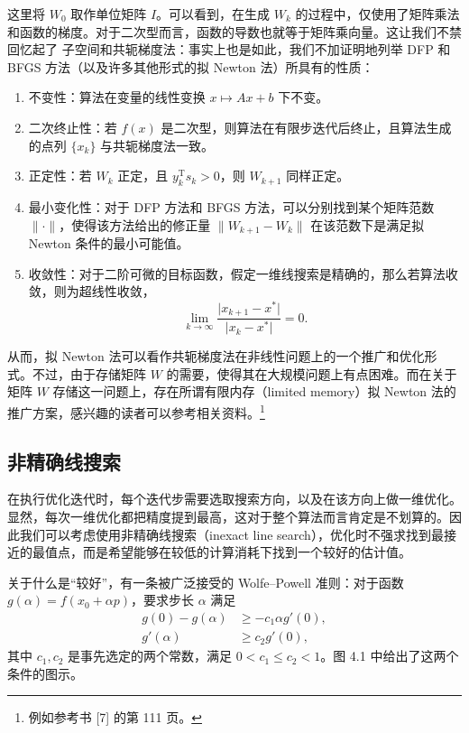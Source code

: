 这里将 $W_0$ 取作单位矩阵 $I$。可以看到，在生成 $W_k$ 的过程中，仅使用了矩阵乘法和函数的梯度。对于二次型而言，函数的导数也就等于矩阵乘向量。这让我们不禁回忆起了  子空间和共轭梯度法：事实上也是如此，我们不加证明地列举 DFP 和 BFGS 方法（以及许多其他形式的拟 Newton 法）所具有的性质：
\begin{enumerate}[label=(\arabic*)]
\item 不变性：算法在变量的线性变换 $x\mapsto Ax+b$ 下不变。
\item 二次终止性：若 $f(x)$ 是二次型，则算法在有限步迭代后终止，且算法生成的点列 $\{x_k\}$ 与共轭梯度法一致。
\item 正定性：若 $W_k$ 正定，且 $y_k^{\mathrm T}s_k>0$，则 $W_{k+1}$ 同样正定。
\item 最小变化性：对于 DFP 方法和 BFGS 方法，可以分别找到某个矩阵范数 $\|\cdot\|$，使得该方法给出的修正量 $\|W_{k+1}-W_k\|$ 在该范数下是满足拟 Newton 条件的最小可能值。
\item 收敛性：对于二阶可微的目标函数，假定一维线搜索是精确的，那么若算法收敛，则为超线性收敛，
\[
\lim_{k\to\infty}\frac{\lvert x_{k+1}-x^*\rvert}{\lvert x_k-x^*\rvert}=0.
\]
\end{enumerate}
从而，拟 Newton 法可以看作共轭梯度法在非线性问题上的一个推广和优化形式。不过，由于存储矩阵 $W$ 的需要，使得其在大规模问题上有点困难。而在关于矩阵 $W$ 存储这一问题上，存在所谓有限内存（limited memory）拟 Newton 法的推广方案，感兴趣的读者可以参考相关资料。\footnote{例如参考书 [7] 的第 111 页。}

\subsection{非精确线搜索}

在执行优化迭代时，每个迭代步需要选取搜索方向，以及在该方向上做一维优化。显然，每次一维优化都把精度提到最高，这对于整个算法而言肯定是不划算的。因此我们可以考虑使用非精确线搜索（inexact line search），优化时不强求找到最接近的最值点，而是希望能够在较低的计算消耗下找到一个较好的估计值。

关于什么是“较好”，有一条被广泛接受的 Wolfe--Powell 准则：对于函数 $g(\alpha)=f(x_0+\alpha p)$，要求步长 $\alpha$ 满足
\begin{align}
g(0)-g(\alpha)&\ge -c_1\alpha g'(0), \tag{4.1.23}\\
g'(\alpha)&\ge c_2 g'(0), \tag{4.1.24}
\end{align}
其中 $c_1,c_2$ 是事先选定的两个常数，满足 $0<c_1\le c_2<1$。图 4.1 中给出了这两个条件的图示。

